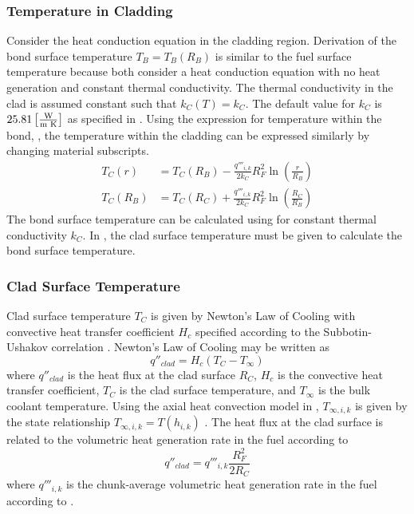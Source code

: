     \subsubsection{Temperature in Cladding}
      Consider the heat conduction equation in the cladding region. Derivation
      of the bond surface temperature $T_B=T_B(R_B)$ is similar to the fuel
      surface temperature because both consider a heat conduction equation with
      no heat generation and constant thermal conductivity.  The thermal
      conductivity in the clad is assumed constant such that $k_C(T) = k_C$. The
      default value for $k_C$ is $25.81 \left[\text{{$\frac{\text{W}}{\text{m K}}$}}\right]$
      as specified in .  Using the expression for
      temperature within the bond, , the temperature within
      the cladding can be expressed similarly by changing material subscripts. 
      \begin{align}
        \label{eq:tcr}
        T_C(r) &= T_C(R_B) - \frac{q'''_{i,k}}{2 k_C} R_F^2
          \ln\left(\frac{r}{R_B}\right) \\
        \label{eq:tb_forward}
        T_C(R_B) &= T_C(R_C) + \frac{q'''_{i,k}}{2 k_C} R_F^2
          \ln\left(\frac{R_C}{R_B}\right)
      \end{align}
      The bond surface temperature can be calculated using 
      for constant thermal conductivity $k_C$. In , the clad
      surface temperature must be given to calculate the bond surface
      temperature.

    \subsubsection{Clad Surface Temperature}
      Clad surface temperature $T_C$ is given by Newton's Law of Cooling with
      convective heat transfer coefficient $H_c$ specified according to the
      Subbotin-Ushakov correlation \cite{subbotinUshakov}. Newton's Law of 
      Cooling may be written as
      \begin{equation}
        q''_{clad} = H_c (T_C - T_{\infty})
      \end{equation}
      where $q''_{clad}$ is the heat flux at the clad surface $R_C$, $H_c$ is
      the convective heat transfer coefficient, $T_C$ is the clad surface
      temperature, and $T_{\infty}$ is the bulk coolant temperature. Using the
      axial heat convection model in ,
      $T_{\infty,i,k}$ is given by the state relationship $T_{\infty,i,k} =
      T(h_{i,k})$ \cite{sodiumProp}. The heat flux at the clad surface is
      related to the volumetric heat generation rate in the fuel according to 
      \begin{equation}
        q''_{clad} = q'''_{i,k} \frac{R_F^2}{2 R_C}
      \end{equation}
      where $q'''_{i,k}$ is the chunk-average volumetric heat generation rate 
      in the fuel according to .

